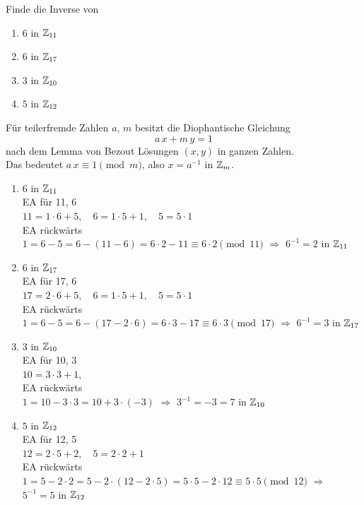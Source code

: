 \begin{aufgabe}[Aufgabe 5]
Finde die Inverse von
\begin{enumerate}[label=\alph*)]
\item $6$ in $\mathbb{Z}_{11}$
\item $6$ in $\mathbb{Z}_{17}$
\item $3$ in $\mathbb{Z}_{10}$
\item $5$ in $\mathbb{Z}_{12}$
\end{enumerate}
\end{aufgabe}
\begin{loesung}
Für teilerfremde Zahlen $a$, $m$ besitzt die Diophantische Gleichung
\[
a\,x + m\,y = 1
\]
nach dem Lemma von Bezout Lösungen $(x, y)$ in ganzen Zahlen.\\
Das bedeutet \quad $a\,x \equiv 1 \pmod{m}$, also $x = a^{-1}$ in $\mathbb{Z}_{m}$.

\begin{enumerate}[label=\alph*)]
\item $6$ in $\mathbb{Z}_{11}$\\
EA für 11, 6\\
$11 = 1\cdot 6 + 5,\quad 6 = 1\cdot 5 + 1,\quad 5 = 5\cdot 1$\\
EA rückwärts\\
$1 = 6 - 5 = 6 - (11 - 6) = 6\cdot 2 - 11 \equiv 6\cdot 2 \pmod{11}$ \quad $\Rightarrow$ \quad $6^{-1} = 2$ in $\mathbb{Z}_{11}$

\item $6$ in $\mathbb{Z}_{17}$\\
EA für 17, 6\\
$17 = 2\cdot 6 + 5,\quad 6 = 1\cdot 5 + 1,\quad 5 = 5\cdot 1$\\
EA rückwärts\\
$1 = 6 - 5 = 6 - (17 - 2\cdot 6) = 6\cdot 3 - 17 \equiv 6\cdot 3 \pmod{17}$ \quad $\Rightarrow$ \quad $6^{-1} = 3$ in $\mathbb{Z}_{17}$

\item $3$ in $\mathbb{Z}_{10}$\\
EA für 10, 3\\
$10 = 3\cdot 3 + 1,$\\
EA rückwärts\\
$1 = 10 - 3\cdot 3 = 10 + 3\cdot(-3)$ \quad $\Rightarrow$ \quad $3^{-1} = -3 = 7$ in $\mathbb{Z}_{10}$

\item $5$ in $\mathbb{Z}_{12}$\\
EA für 12, 5\\
$12 = 2\cdot 5 + 2,\quad 5 = 2\cdot 2 + 1$\\
EA rückwärts\\
$1 = 5 - 2\cdot 2 = 5 - 2\cdot(12 - 2\cdot 5) = 5\cdot 5 - 2\cdot 12 \equiv 5\cdot 5 \pmod{12}$ \quad $\Rightarrow$ \quad $5^{-1} = 5$ in $\mathbb{Z}_{12}$
\end{enumerate}
\end{loesung}
